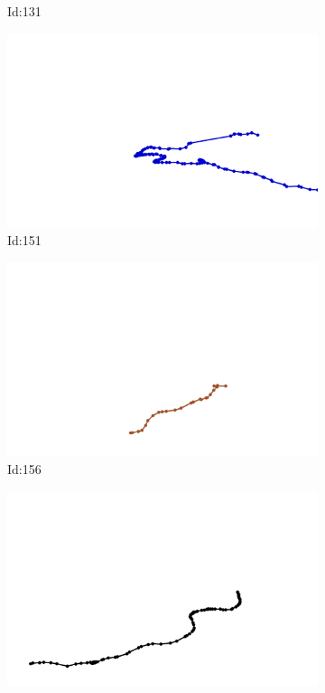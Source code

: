 \documentclass[12pt,twoside]{report}
\begin{document}
\begin{figure}
\begin{subfigure}[b]{0.20\textwidth}
\caption{Id:131}
\end{subfigure}
\begin{subfigure}[b]{0.20\textwidth}
\centering
\includegraphics[width=\textwidth]{../trajectories/151.png}
\caption{Id:151}
\end{subfigure}
\begin{subfigure}[b]{0.20\textwidth}
\centering
\includegraphics[width=\textwidth]{../trajectories/156.png}
\caption{Id:156}
\end{subfigure}
\begin{subfigure}[b]{0.20\textwidth}
\centering
\includegraphics[width=\textwidth]{../trajectories/203.png}

\end{subfigure}
\end{figure}
\end{document}
